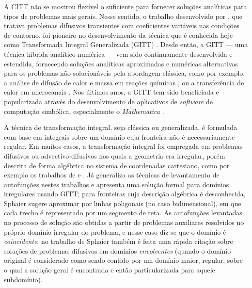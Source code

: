 A CITT não se mostrou flexível o suficiente para fornecer
soluções analíticas para tipos de problemas mais gerais. Nesse sentido, o trabalho desenvolvido por \cite{artigo_murray},
que tratava problemas difusivos transientes com coeficientes variáveis nas condições de contorno, foi pioneiro no desenvolvimento da técnica
que é conhecida hoje como Transformada Integral Generalizada (GITT) \citep{livro_integral_transforms_cotta}. Desde então, a GITT --- uma técnica
híbrida analítico-numérica --- vem sido continuamente desenvolvida e estendida, fornecendo soluções analíticas aproximadas e numéricas alternativas
para os problemas não solucionáveis pela abordagem clássica, como por exemplo, a análise de difusão de calor e massa em reações químicas \citep{artigo_difusao_calor_massa}, ou a transferência de calor em microcanais \citep{artigo_abreu_microcanal}. Nos últimos anos, a GITT tem sido beneficiada e popularizada através do desenvolvimento de
aplicativos de \textit{software} de computação simbólica, especialmente o \textit{Mathematica}\textsuperscript{\textregistered} \citep{artigo_mathematica}.

A técnica de transformação integral, seja clássica ou generalizada, é formulada com base em integrais sobre um domínio cuja
fronteira não é necessariamente regular. Em muitos casos, a transformação integral foi empregada em problemas difusivos ou advectivo-difusivos nos quais a geometria
era irregular, porém descrita de forma algébrica no sistema de coordenadas cartesiano, como por exemplo os trabalhos de \cite{artigo_aparecido, artigo_aparecido_2, artigo_aparecido_3, artigo_fausto} e \cite{artigo_perez}.
Já \cite{tese_sphaier} generaliza as técnicas de levantamento de autofunções nestes trabalhos e apresenta uma solução formal para domínios irregulares usando GITT;
para fronteiras cuja descrição algébrica é desconhecida, Sphaier sugere aproximar por linhas poligonais (no caso bidimensional), em que cada
trecho é representado por um segmento de reta. As autofunções levantadas no processo de solução são obtidas a partir de problemas auxiliares resolvidos no próprio
domínio irregular do problema, e nesse caso diz-se que o domínio é \textit{coincidente}; no trabalho de Sphaier também é feita uma rápida citação sobre soluções de problemas difusivos em domínios \textit{envolventes}
(quando o domínio original é considerado como sendo contido por um domínio maior, regular, sobre o qual a solução geral é encontrada e então particularizada
para aquele subdomínio).

